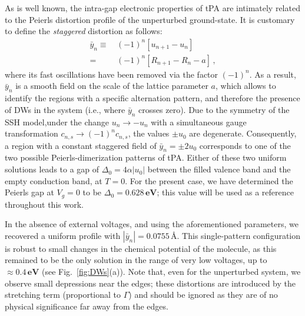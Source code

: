 \documentclass[10pt,a4paper]{article}
\begin{document}
As is well known\cite{Heeger88_Solitons_in_conducting_polymers,Su79_Solitons_in_polyacetylene,Su80_Dynamics_of_solitons_in_PA}, the intra-gap electronic properties of tPA are intimately related to the Peierls distortion profile of the unperturbed ground-state. It is customary to define the \textit{staggered} distortion as follows:
%
\begin{align}\label{eq:staggered_field}
\bar{y}_{n} \equiv & \, (-1)^{n} \left[ u_{n+1} - u_{n} \right] \nonumber\\
= & \, (-1)^{n} \left[ R_{n+1} - R_{n} - a \right]\, ,
\end{align}
%
where its fast oscillations have been removed via the factor $(-1)^{n}$. As a result, $\bar{y}_{n}$ is a smooth field on the scale of the lattice parameter $a$, which allows to identify the regions with a specific alternation pattern, and therefore the presence of DWs in the system (i.e., where $\bar{y}_{n}$ crosses zero). Due to the symmetry of the SSH model,under the change $u_n \to -u_n$ with a simultaneous gauge transformation $c_{n,s} \to (-1)^n c_{n,s}$, the values $\pm u_{0}$ are degenerate. Consequently, a region with a constant staggered field of ${\bar{y}_{n} = \pm 2 u_{0}}$ corresponds to one of the two possible Peierls-dimerization patterns of tPA. Either of these two uniform solutions leads to a gap of ${\Delta_{0} = 4 \alpha \left| u_{0} \right|}$ between the filled valence band and the empty conduction band, at ${T = 0}$. For the present case, we have determined the Peierls gap at ${V_{g} = 0}$ to be ${\Delta_{0} = 0.628 \, \textbf{eV}}$; this value will be used as a reference throughout this work.

In the absence of external voltages, and using the aforementioned parameters, we recovered a uniform profile with ${|\bar{y}_{n}| = 0.0755 \, \textbf{\AA}}$. This single-pattern configuration is robust to small changes in the chemical potential of the molecule, as this remained to be the only solution in the range of very low voltages, up to ${\approx 0.4 \, \textbf{eV}}$ (see Fig.~\ref{fig:DWs}(a)). Note that, even for the unperturbed system, we observe small depressions near the edges; these distortions are introduced by the stretching term (proportional to $\Gamma$) and should be ignored as they are of no physical significance far away from the edges.
\end{document}
